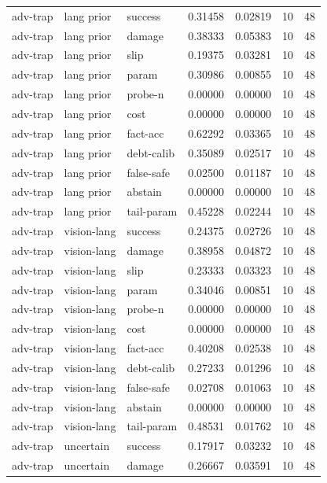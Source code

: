 \documentclass{article}
\begin{document}
\begin{center}
\begin{longtable}{lllllll}
adv-trap & lang prior & success & 0.31458 & 0.02819 & 10 & 48 \\
adv-trap & lang prior & damage & 0.38333 & 0.05383 & 10 & 48 \\
adv-trap & lang prior & slip & 0.19375 & 0.03281 & 10 & 48 \\
adv-trap & lang prior & param & 0.30986 & 0.00855 & 10 & 48 \\
adv-trap & lang prior & probe-n & 0.00000 & 0.00000 & 10 & 48 \\
adv-trap & lang prior & cost & 0.00000 & 0.00000 & 10 & 48 \\
adv-trap & lang prior & fact-acc & 0.62292 & 0.03365 & 10 & 48 \\
adv-trap & lang prior & debt-calib & 0.35089 & 0.02517 & 10 & 48 \\
adv-trap & lang prior & false-safe & 0.02500 & 0.01187 & 10 & 48 \\
adv-trap & lang prior & abstain & 0.00000 & 0.00000 & 10 & 48 \\
adv-trap & lang prior & tail-param & 0.45228 & 0.02244 & 10 & 48 \\
adv-trap & vision-lang & success & 0.24375 & 0.02726 & 10 & 48 \\
adv-trap & vision-lang & damage & 0.38958 & 0.04872 & 10 & 48 \\
adv-trap & vision-lang & slip & 0.23333 & 0.03323 & 10 & 48 \\
adv-trap & vision-lang & param & 0.34046 & 0.00851 & 10 & 48 \\
adv-trap & vision-lang & probe-n & 0.00000 & 0.00000 & 10 & 48 \\
adv-trap & vision-lang & cost & 0.00000 & 0.00000 & 10 & 48 \\
adv-trap & vision-lang & fact-acc & 0.40208 & 0.02538 & 10 & 48 \\
adv-trap & vision-lang & debt-calib & 0.27233 & 0.01296 & 10 & 48 \\
adv-trap & vision-lang & false-safe & 0.02708 & 0.01063 & 10 & 48 \\
adv-trap & vision-lang & abstain & 0.00000 & 0.00000 & 10 & 48 \\
adv-trap & vision-lang & tail-param & 0.48531 & 0.01762 & 10 & 48 \\
adv-trap & uncertain & success & 0.17917 & 0.03232 & 10 & 48 \\
adv-trap & uncertain & damage & 0.26667 & 0.03591 & 10 & 48 \\
\bottomrule
\end{longtable}
\renewcommand{\arraystretch}{1.0}
\end{center}
\end{document}
